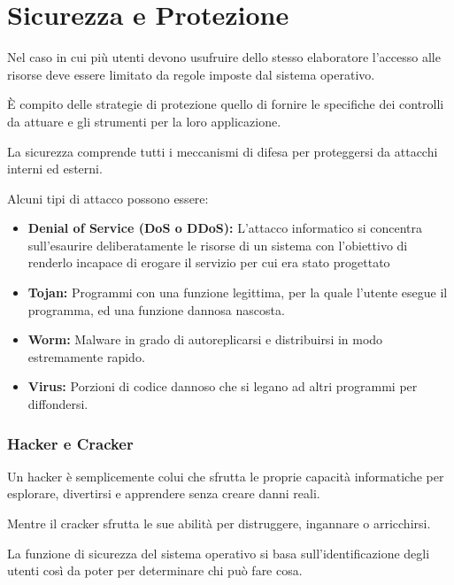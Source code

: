 \section{Sicurezza e Protezione}
Nel caso in cui più utenti devono usufruire dello stesso elaboratore l'accesso alle risorse deve essere limitato da regole imposte dal sistema operativo.

È compito delle strategie di protezione quello di fornire le specifiche dei controlli da attuare e gli strumenti per la loro applicazione.

\spacer
La sicurezza comprende tutti i meccanismi di difesa per proteggersi da attacchi interni ed esterni.

Alcuni tipi di attacco possono essere:
\begin{itemize}
    \item \textbf{Denial of Service (DoS o DDoS):} L'attacco informatico si concentra sull'esaurire deliberatamente le risorse di un sistema con l'obiettivo di renderlo incapace di erogare il servizio per cui era stato progettato
    \item \textbf{Tojan:} Programmi con una funzione legittima, per la quale l'utente esegue il programma, ed una funzione dannosa nascosta.
    \item \textbf{Worm:} Malware in grado di autoreplicarsi e distribuirsi in modo estremamente rapido.
    \item \textbf{Virus:} Porzioni di codice dannoso che si legano ad altri programmi per diffondersi.
\end{itemize}

\begin{note}
    \subsubsection*{Hacker e Cracker}
    Un hacker è semplicemente colui che sfrutta le proprie capacità informatiche per esplorare, divertirsi e apprendere senza creare danni reali.

    Mentre il cracker sfrutta le sue abilità per distruggere, ingannare o arricchirsi.
\end{note}

La funzione di sicurezza del sistema operativo si basa sull'identificazione degli utenti così da poter per determinare chi può fare cosa.